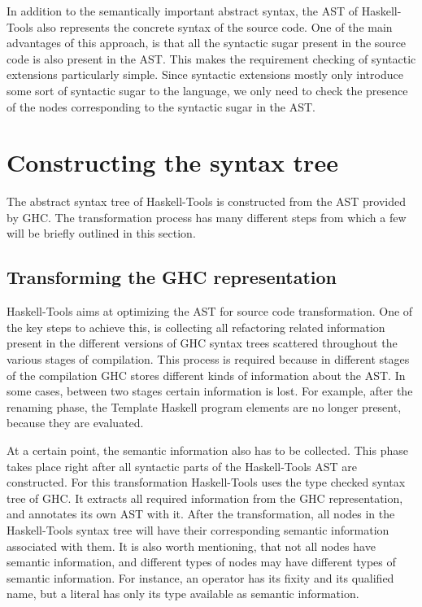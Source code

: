 \documentclass[main.tex]{subfiles}
\begin{document}
	In addition to the semantically important abstract syntax, the AST of Haskell-Tools also represents the concrete syntax of the source code. One of the main advantages of this approach, is that all the syntactic sugar present in the source code is also present in the AST. This makes the requirement checking of syntactic extensions particularly simple. Since syntactic extensions mostly only introduce some sort of syntactic sugar to the language, we only need to check the presence of the nodes corresponding to the syntactic sugar in the AST.
	
	\section{Constructing the syntax tree}
	
	The abstract syntax tree of Haskell-Tools is constructed from the AST provided by GHC. The transformation process has many different steps from which a few will be briefly outlined in this section.
	
	\subsection{Transforming the GHC representation}
	
	Haskell-Tools aims at optimizing the AST for source code transformation. One of the key steps to achieve this, is collecting all refactoring related information present in the different versions of GHC syntax trees scattered throughout the various stages of compilation. This process is required because in different stages of the compilation GHC stores different kinds of information about the AST. In some cases, between two stages certain information is lost. For example, after the renaming phase, the Template Haskell program elements are no longer present, because they are evaluated.
	
	At a certain point, the semantic information also has to be collected. This phase takes place right after all syntactic parts of the Haskell-Tools AST are constructed. For this transformation Haskell-Tools uses the type checked syntax tree of GHC. It extracts all required information from the GHC representation, and annotates its own AST with it. After the transformation, all nodes in the Haskell-Tools syntax tree will have their corresponding semantic information associated with them. It is also worth mentioning, that not all nodes have semantic information, and different types of nodes may have different types of semantic information. For instance, an operator has its fixity and its qualified name, but a literal has only its type available as semantic information.
	
\end{document}
